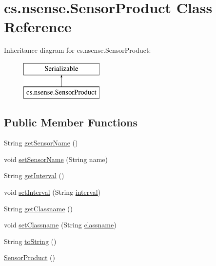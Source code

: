 \hypertarget{classcs_1_1nsense_1_1_sensor_product}{\section{cs.\-nsense.\-Sensor\-Product Class Reference}
\label{classcs_1_1nsense_1_1_sensor_product}
}
Inheritance diagram for cs.\-nsense.\-Sensor\-Product\-:\begin{figure}[H]
\begin{center}
\leavevmode
\includegraphics[height=2.000000cm]{classcs_1_1nsense_1_1_sensor_product}
\end{center}
\end{figure}
\subsection*{Public Member Functions}
\begin{DoxyCompactItemize}
\item 
String \hyperlink{classcs_1_1nsense_1_1_sensor_product_ad45784dbffac405fa7e5d79b25e309f1}{get\-Sensor\-Name} ()
\item 
void \hyperlink{classcs_1_1nsense_1_1_sensor_product_aeb12aa8307041df33374c02d66f44119}{set\-Sensor\-Name} (String name)
\item 
String \hyperlink{classcs_1_1nsense_1_1_sensor_product_ad23c00bdde690e158ee51265ba0c415a}{get\-Interval} ()
\item 
void \hyperlink{classcs_1_1nsense_1_1_sensor_product_a60ba1679ffb3a16ddb97846134dc6f75}{set\-Interval} (String \hyperlink{classcs_1_1nsense_1_1_sensor_product_ac5bb060ad08911197b4de5719698f83b}{interval})
\item 
String \hyperlink{classcs_1_1nsense_1_1_sensor_product_a653e49e0bdae66dd8ddfd64f0078ccfd}{get\-Classname} ()
\item 
void \hyperlink{classcs_1_1nsense_1_1_sensor_product_aff4f38a9f2f78ebf7bb6cde4bb402d88}{set\-Classname} (String \hyperlink{classcs_1_1nsense_1_1_sensor_product_a2e000b524373c9f860222c2198153d2f}{classname})
\item 
String \hyperlink{classcs_1_1nsense_1_1_sensor_product_aaeb5bf3acb553d4cb68cb6808b731110}{to\-String} ()
\item 
\hyperlink{classcs_1_1nsense_1_1_sensor_product_acd54394ae1c9fe5fd88f0d7f9648594c}{Sensor\-Product} ()
\end{DoxyCompactItemize}
